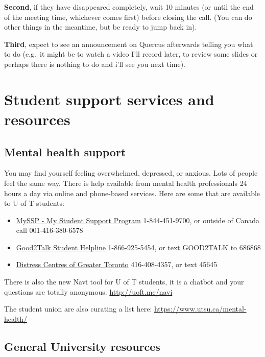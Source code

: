 \documentclass[
]{book}
\begin{document}
\textbf{Second}, if they have disappeared completely, wait 10 minutes (or until the end of the meeting time, whichever comes first) before closing the call. (You can do other things in the meantime, but be ready to jump back in).

\textbf{Third}, expect to see an announcement on Quercus afterwards telling you what to do (e.g.~it might be to watch a video I'll record later, to review some slides or perhaps there is nothing to do and i'll see you next time).

\hypertarget{student-support-services-and-resources}{%
\section{Student support services and resources}\label{student-support-services-and-resources}}

\hypertarget{mental-health-support}{%
\subsection{Mental health support}\label{mental-health-support}}

You may find yourself feeling overwhelmed, depressed, or anxious. Lots of people feel the same way. There is help available from mental health professionals 24 hours a day via online and phone-based services. Here are some that are available to U of T students:

\begin{itemize}
\item
  \href{https://www.studentlife.utoronto.ca/hwc/myssp}{MySSP - My Student Support Program} 1-844-451-9700, or outside of Canada call 001-416-380-6578
\item
  \href{https://good2talk.ca/}{Good2Talk Student Helpline} 1-866-925-5454, or text GOOD2TALK to 686868
\item
  \href{https://www.torontodistresscentre.com/}{Distress Centres of Greater Toronto} 416-408-4357, or text 45645
\end{itemize}

There is also the new Navi tool for U of T students, it is a chatbot and your questions are totally anonymous. \url{http://uoft.me/navi}

The student union are also curating a list here: \url{https://www.utsu.ca/mental-health/}

\hypertarget{general-university-resources}{%
\subsection{General University resources}\label{general-university-resources}}
\end{document}
